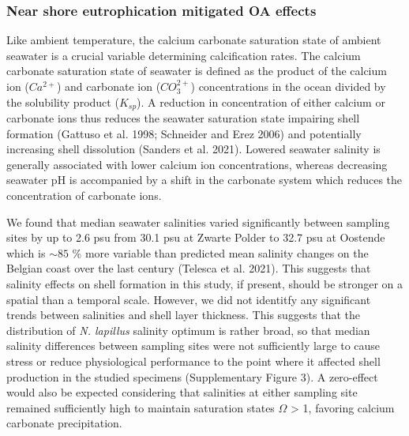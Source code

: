 \documentclass[smallextended]{svjour3}       %
\begin{document}
\hypertarget{near-shore-eutrophication-mitigated-oa-effects}{%
\subsubsection{Near shore eutrophication mitigated OA
effects}\label{near-shore-eutrophication-mitigated-oa-effects}}

Like ambient temperature, the calcium carbonate saturation state of
ambient seawater is a crucial variable determining calcification rates.
The calcium carbonate saturation state of seawater is defined as the
product of the calcium ion (\(Ca^{2+}\)) and carbonate ion
(\(CO_3^{2+}\)) concentrations in the ocean divided by the solubility
product (\(K_{sp}\)). A reduction in concentration of either calcium or
carbonate ions thus reduces the seawater saturation state impairing
shell formation (Gattuso et al. 1998; Schneider and Erez 2006) and
potentially increasing shell dissolution (Sanders et al. 2021). Lowered
seawater salinity is generally associated with lower calcium ion
concentrations, whereas decreasing seawater pH is accompanied by a shift
in the carbonate system which reduces the concentration of carbonate
ions.

We found that median seawater salinities varied significantly between
sampling sites by up to 2.6 psu from 30.1 psu at Zwarte Polder to 32.7
psu at Oostende which is \(\sim85\) \% more variable than predicted mean
salinity changes on the Belgian coast over the last century (Telesca et
al. 2021). This suggests that salinity effects on shell formation in
this study, if present, should be stronger on a spatial than a temporal
scale. However, we did not identitfy any significant trends between
salinities and shell layer thickness. This suggests that the
distribution of \emph{N. lapillus} salinity optimum is rather broad, so
that median salinity differences between sampling sites were not
sufficiently large to cause stress or reduce physiological performance
to the point where it affected shell production in the studied specimens
(Supplementary Figure 3). A zero-effect would also be expected
considering that salinities at either sampling site remained
sufficiently high to maintain saturation states \(\Omega\)
\textgreater{} 1, favoring calcium carbonate precipitation.
\end{document}
